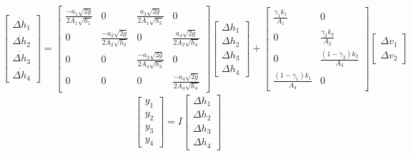 \begin{multline}
	\begin{bmatrix}
		\dot{\Delta h_{1}} \\
		\dot{\Delta h_{2}} \\
		\dot{\Delta h_{3}} \\
		\dot{\Delta h_{4}} 
	\end{bmatrix}
	= 
	\begin{bmatrix}
		\frac{-a_{1}\sqrt{2g}}{2A_{1}\sqrt{h_{1}}} & 0 & \frac{a_{3}\sqrt{2g}}{2A_{1}\sqrt{h_{3}}} & 0 \\
		0 & \frac{-a_{2}\sqrt{2g}}{2A_{2}\sqrt{h_{2}}} & 0 & \frac{a_{4}\sqrt{2g}}{2A_{2}\sqrt{h_{4}}} \\
		0 & 0 & \frac{-a_{3}\sqrt{2g}}{2A_{3}\sqrt{h_{3}}} & 0 \\
		0 & 0 & 0 & \frac{-a_{4}\sqrt{2g}}{2A_{4}\sqrt{h_{4}}}
	\end{bmatrix}
	\begin{bmatrix}
		\Delta h_{1} \\
		\Delta h_{2} \\
		\Delta h_{3} \\
		\Delta h_{4} 
	\end{bmatrix}
	+
	\begin{bmatrix}
		\frac{\gamma_{1}k_{1}}{A_{1}} & 0 \\
		0 & \frac{\gamma_{2}k_{2}}{A_{2}} \\
		0 & \frac{(1-\gamma_{2}) k_{2}}{A_{3}} \\
		\frac{(1-\gamma_{1})k_{1}}{A_{4}} & 0
	\end{bmatrix}
	\begin{bmatrix}
		\Delta v_{1} \\
		\Delta v_{2}
	\end{bmatrix}
	\label{eq2}
\end{multline}
\begin{equation}
	\begin{bmatrix}
		y_{1} \\
		y_{2} \\
		y_{3} \\
		y_{4} 
	\end{bmatrix}
	= 
	I
	\begin{bmatrix}
		\Delta h_{1} \\
		\Delta h_{2} \\
		\Delta h_{3} \\
		\Delta h_{4} 
	\end{bmatrix}
	\label{eq3}
\end{equation}

